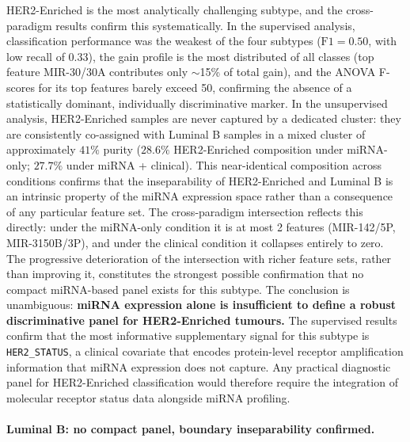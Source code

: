 HER2-Enriched is the most analytically challenging subtype, and the cross-paradigm
results confirm this systematically. In the supervised analysis, classification
performance was the weakest of the four subtypes ($\text{F1} = 0.50$, with low recall
of $0.33$), the gain profile is the most distributed of all classes (top feature
MIR-30/30A contributes only $\sim$15\% of total gain), and the ANOVA F-scores for its
top features barely exceed 50, confirming the absence of a statistically dominant,
individually discriminative marker. In the unsupervised analysis, HER2-Enriched samples
are never captured by a dedicated cluster: they are consistently co-assigned with
Luminal B samples in a mixed cluster of approximately $41\%$ purity ($28.6\%$
HER2-Enriched composition under miRNA-only; $27.7\%$ under miRNA + clinical). This
near-identical composition across conditions confirms that the inseparability of
HER2-Enriched and Luminal B is an intrinsic property of the miRNA expression space
rather than a consequence of any particular feature set. The cross-paradigm
intersection reflects this directly: under the miRNA-only condition it is at most 2
features (MIR-142/5P, MIR-3150B/3P), and under the clinical condition it collapses
entirely to zero. The progressive deterioration of the intersection with richer
feature sets, rather than improving it, constitutes the strongest possible confirmation
that no compact miRNA-based panel exists for this subtype. The conclusion is
unambiguous: \textbf{miRNA expression alone is insufficient to define a robust
discriminative panel for HER2-Enriched tumours.} The supervised results confirm that
the most informative supplementary signal for this subtype is \texttt{HER2\_STATUS},
a clinical covariate that encodes protein-level receptor amplification information
that miRNA expression does not capture. Any practical diagnostic panel for
HER2-Enriched classification would therefore require the integration of molecular
receptor status data alongside miRNA profiling.

\paragraph{Luminal B: no compact panel, boundary inseparability confirmed.}

